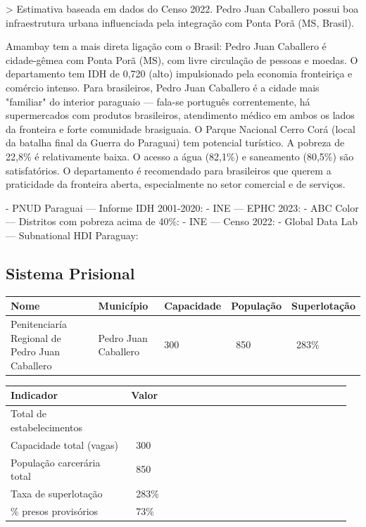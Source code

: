 > Estimativa baseada em dados do Censo 2022. Pedro Juan Caballero possui boa infraestrutura urbana influenciada pela integração com Ponta Porã (MS, Brasil).


Amambay tem a mais direta ligação com o Brasil: Pedro Juan Caballero é cidade-gêmea com Ponta Porã (MS), com livre circulação de pessoas e moedas. O departamento tem IDH de 0,720 (alto) impulsionado pela economia fronteiriça e comércio intenso. Para brasileiros, Pedro Juan Caballero é a cidade mais "familiar" do interior paraguaio --- fala-se português correntemente, há supermercados com produtos brasileiros, atendimento médico em ambos os lados da fronteira e forte comunidade brasiguaia. O Parque Nacional Cerro Corá (local da batalha final da Guerra do Paraguai) tem potencial turístico. A pobreza de 22,8\% é relativamente baixa. O acesso a água (82,1\%) e saneamento (80,5\%) são satisfatórios. O departamento é recomendado para brasileiros que querem a praticidade da fronteira aberta, especialmente no setor comercial e de serviços.


- PNUD Paraguai --- Informe IDH 2001-2020: 
- INE --- EPHC 2023: 
- ABC Color --- Distritos com pobreza acima de 40\%: 
- INE --- Censo 2022: 
- Global Data Lab --- Subnational HDI Paraguay: 


\subsection{Sistema Prisional}



{\small
\setlength{\tabcolsep}{3pt}
\renewcommand{\arraystretch}{1.12}
{\small
\begin{tabularx}{\linewidth}{lXXXX}
\toprule
Nome & Município & Capacidade & População & Superlotação \\
\midrule
Penitenciaría Regional de Pedro Juan Caballero & Pedro Juan Caballero & 300 & ~850 & ~283\% \\
\bottomrule
\end{tabularx}
}
}


{\small
\setlength{\tabcolsep}{3pt}
\renewcommand{\arraystretch}{1.12}
\begin{tabularx}{\linewidth}{>{\raggedright\arraybackslash}p{0.34\linewidth} >{\raggedright\arraybackslash}p{0.62\linewidth}}
\toprule
Indicador & Valor \\
\midrule
Total de estabelecimentos & 1 \\
Capacidade total (vagas) & ~300 \\
População carcerária total & ~850 \\
Taxa de superlotação & ~283\% \\
\% presos provisórios & ~73\% \\
\bottomrule
\end{tabularx}
}



